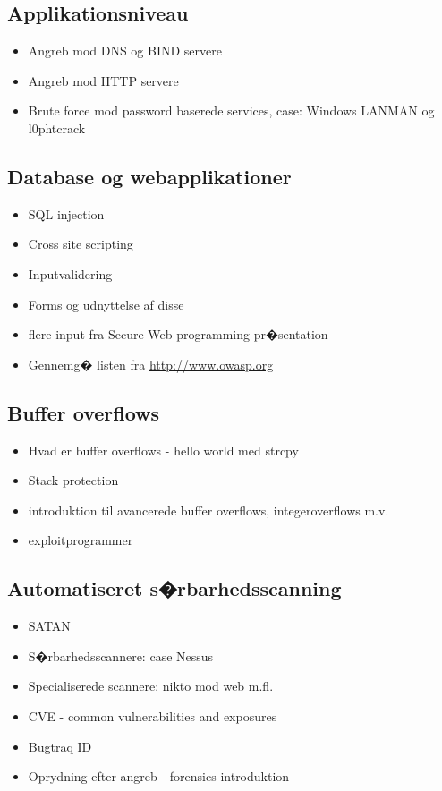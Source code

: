 \documentclass[a4paper,12pt]{article}
\newcommand{\link}[1]{\href{#1}{#1}}
\begin{document}
\subsection{Applikationsniveau}

\begin{itemize}
\item Angreb mod DNS og BIND servere
\item Angreb mod HTTP servere
\item Brute force mod password baserede services, case: Windows LANMAN
  og l0phtcrack
\end{itemize}

\subsection{Database og webapplikationer}

\begin{itemize}
\item SQL injection
\item Cross site scripting
\item Inputvalidering
\item Forms og udnyttelse af disse
\item flere input fra Secure Web programming pr�sentation
\item Gennemg� listen fra \link{http://www.owasp.org}
\end{itemize}


\subsection{Buffer overflows}

\begin{itemize}
\item Hvad er buffer overflows - hello world med strcpy
\item Stack protection
\item introduktion til avancerede buffer overflows, integeroverflows m.v.
\item exploitprogrammer
\end{itemize}

\subsection{Automatiseret s�rbarhedsscanning}
\begin{itemize}
\item SATAN
\item S�rbarhedsscannere: case Nessus
\item Specialiserede scannere: nikto mod web m.fl.
\item CVE - common vulnerabilities and exposures
\item Bugtraq ID
\item Oprydning efter angreb - forensics introduktion
\end{itemize}
\end{document}
